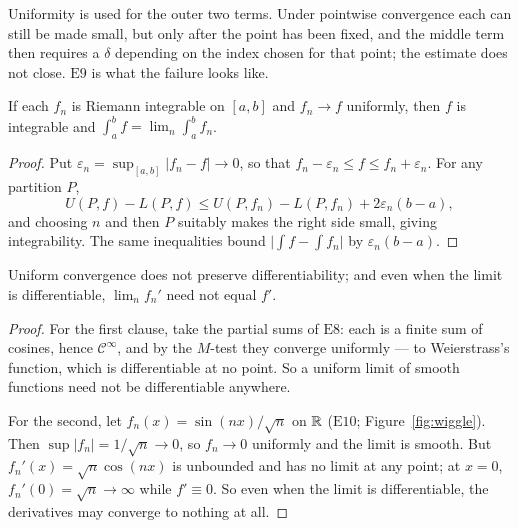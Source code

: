 Uniformity is used for the outer two terms. Under pointwise convergence each
can still be made small, but only after the point has been fixed, and the
middle term then requires a $\delta$ depending on the index chosen for that
point; the estimate does not close. $\mathrm{E}9$ is what the failure looks
like.

\begin{theorem}\label{thm:unifint}
If each $f_n$ is Riemann integrable on $[a,b]$ and $f_n\to f$ uniformly, then
$f$ is integrable and $\int_a^b f = \lim_n \int_a^b f_n$.
\end{theorem}


\begin{proof}
Put $\varepsilon_n = \sup_{[a,b]}|f_n-f| \to 0$, so that
$f_n-\varepsilon_n \le f \le f_n+\varepsilon_n$. For any partition $P$,
\[ U(P,f)-L(P,f) \le U(P,f_n)-L(P,f_n)+2\varepsilon_n(b-a), \]
and choosing $n$ and then $P$ suitably makes the right side small, giving
integrability. The same inequalities bound
$\bigl|\int f - \int f_n\bigr|$ by $\varepsilon_n(b-a)$.
\end{proof}

\begin{theorem}\label{thm:unifdiff}
Uniform convergence does not preserve differentiability; and even when the
limit is differentiable, $\lim_n f_n'$ need not equal $f'$.
\end{theorem}

\begin{proof}
For the first clause, take the partial sums of $\mathrm{E}8$: each is a
finite sum of cosines, hence $\mathscr{C}^\infty$, and by the $M$-test they
converge uniformly --- to Weierstrass's function, which is differentiable at
no point. So a uniform limit of smooth functions need not be differentiable
anywhere.

For the second, let $f_n(x)=\sin(nx)/\sqrt n$ on $\mathbb{R}$
($\mathrm{E}10$; Figure~\ref{fig:wiggle}).
Then $\sup|f_n| = 1/\sqrt n \to 0$, so $f_n \to 0$ uniformly and the limit
is smooth. But $f_n'(x)=\sqrt n\cos(nx)$ is unbounded and has no limit at
any point; at $x=0$, $f_n'(0)=\sqrt n \to \infty$ while $f'\equiv 0$. So
even when the limit is differentiable, the derivatives may converge to
nothing at all.
\end{proof}

